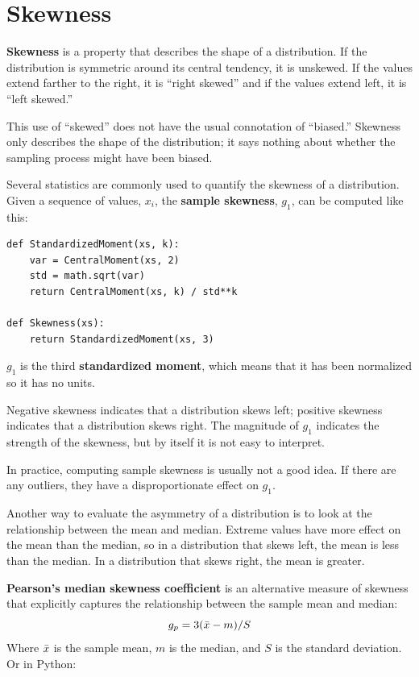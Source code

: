 \documentclass[12pt]{book}
\begin{document}
\section{Skewness}

{\bf Skewness} is a property that describes the shape of a distribution.
If the distribution is symmetric around its central tendency, it is
unskewed.  If the values extend farther to the right, it is ``right
skewed'' and if the values extend left, it is ``left skewed.''

This use of ``skewed'' does not have the usual connotation of
``biased.''  Skewness only describes the shape of the distribution;
it says nothing about whether the sampling process might have been
biased.

Several statistics are commonly used to quantify the skewness of a
distribution.  Given a sequence of values, $x_i$, the {\bf sample
  skewness}, $g_1$, can be computed like this:

\begin{verbatim}
def StandardizedMoment(xs, k):
    var = CentralMoment(xs, 2)
    std = math.sqrt(var)
    return CentralMoment(xs, k) / std**k

def Skewness(xs):
    return StandardizedMoment(xs, 3)
\end{verbatim}

$g_1$ is the third {\bf standardized moment}, which means that it has
been normalized so it has no units.

Negative skewness indicates that a distribution 
skews left; positive skewness indicates
that a distribution skews right.  The magnitude of $g_1$ indicates
the strength of the skewness, but by itself it is not easy to
interpret.

In practice, computing sample skewness is usually not
a good idea.  If there are any outliers, they
have a disproportionate effect on $g_1$.

Another way to evaluate the asymmetry of a distribution is to look
at the relationship between the mean and median.
Extreme values have more effect on the mean than the median, so
in a distribution that skews left, the mean is less than the median.
In a distribution that skews right, the mean is greater.

{\bf Pearson's median skewness coefficient} is an alternative measure
of skewness that explicitly captures the relationship between the
sample mean and median:
%
\[ g_p = 3 (\bar{x} - m) / S \]
%
Where $\bar{x}$ is the sample mean, $m$ is the median, and
$S$ is the standard deviation.  Or in Python:
\end{document}
